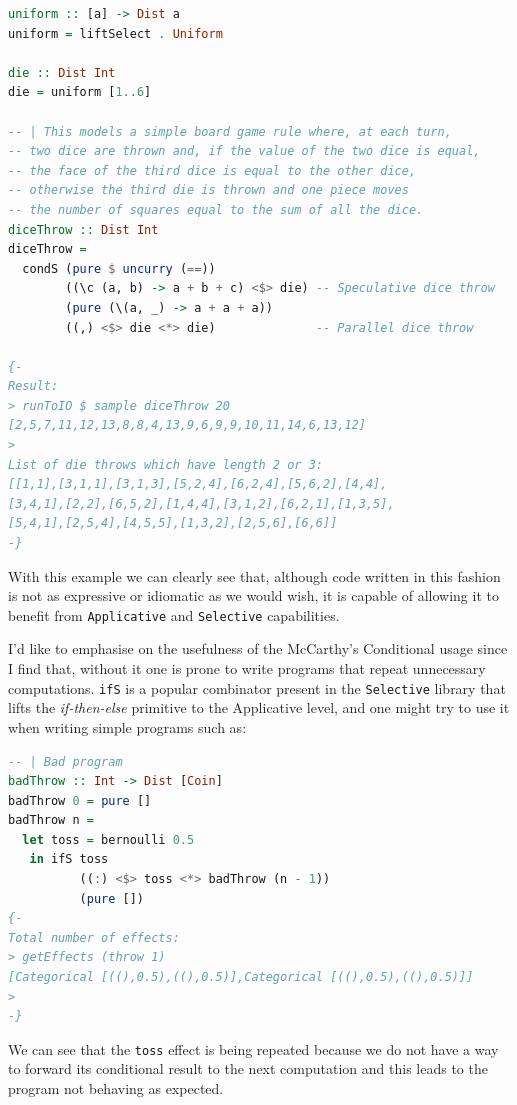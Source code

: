 \documentclass[
  oneside,
  11pt, a4paper,
  footinclude=true,
  headinclude=true,
  cleardoublepage=empty
]{scrbook}
\theoremstyle{definition}
\theoremstyle{definition}
\begin{document}
    \begin{lstlisting}[language=Haskell, caption={Throw N coins},captionpos=b, label={lst:dicethrow}]
uniform :: [a] -> Dist a
uniform = liftSelect . Uniform
 
die :: Dist Int
die = uniform [1..6]

-- | This models a simple board game rule where, at each turn,
-- two dice are thrown and, if the value of the two dice is equal,
-- the face of the third dice is equal to the other dice,
-- otherwise the third die is thrown and one piece moves
-- the number of squares equal to the sum of all the dice.
diceThrow :: Dist Int
diceThrow =
  condS (pure $ uncurry (==))
        ((\c (a, b) -> a + b + c) <$> die) -- Speculative dice throw
        (pure (\(a, _) -> a + a + a))
        ((,) <$> die <*> die)              -- Parallel dice throw

{-
Result:
> runToIO $ sample diceThrow 20
[2,5,7,11,12,13,8,8,4,13,9,6,9,9,10,11,14,6,13,12]
>
List of die throws which have length 2 or 3:
[[1,1],[3,1,1],[3,1,3],[5,2,4],[6,2,4],[5,6,2],[4,4],
[3,4,1],[2,2],[6,5,2],[1,4,4],[3,1,2],[6,2,1],[1,3,5],
[5,4,1],[2,5,4],[4,5,5],[1,3,2],[2,5,6],[6,6]]
-}
    \end{lstlisting}
    
    With this example we can clearly see that, although code written in this fashion is not as expressive or idiomatic as we would wish, it is capable of allowing it to benefit from \texttt{Applicative} and \texttt{Selective} capabilities. 
    
    I'd like to emphasise on the usefulness of the McCarthy's Conditional usage since I find that, without it one is prone to write programs that repeat unnecessary computations. \texttt{ifS} is a popular combinator present in the \texttt{Selective} library that lifts the \textit{if-then-else} primitive to the Applicative level, and one might try to use it when writing simple programs such as:
    
    \begin{lstlisting}[language=Haskell, caption={Bad program},captionpos=b]
-- | Bad program
badThrow :: Int -> Dist [Coin]
badThrow 0 = pure []
badThrow n =
  let toss = bernoulli 0.5
   in ifS toss
          ((:) <$> toss <*> badThrow (n - 1))
          (pure [])
{-
Total number of effects:
> getEffects (throw 1)
[Categorical [((),0.5),((),0.5)],Categorical [((),0.5),((),0.5)]]
>
-}
    \end{lstlisting}
    
    We can see that the \texttt{toss} effect is being repeated because we do not have a way to forward its conditional result to the next computation and this leads to the program not behaving as expected.
    
\end{document}
